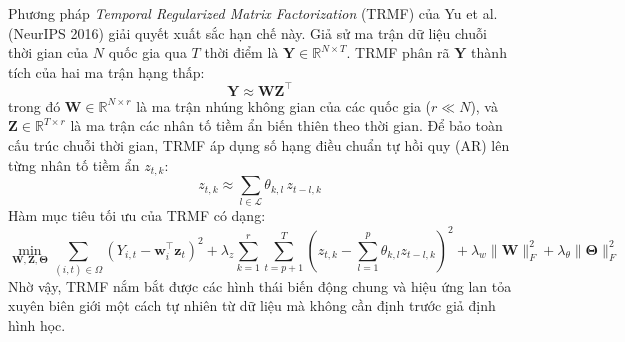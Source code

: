Phương pháp \textit{Temporal Regularized Matrix Factorization} (TRMF) của Yu et al. (NeurIPS 2016) \cite{yu2016trmf} giải quyết xuất sắc hạn chế này. Giả sử ma trận dữ liệu chuỗi thời gian của $N$ quốc gia qua $T$ thời điểm là $\mathbf{Y} \in \mathbb{R}^{N \times T}$. TRMF phân rã $\mathbf{Y}$ thành tích của hai ma trận hạng thấp:
\begin{equation}
    \mathbf{Y} \approx \mathbf{W} \mathbf{Z}^\top
\end{equation}
trong đó $\mathbf{W} \in \mathbb{R}^{N \times r}$ là ma trận nhúng không gian của các quốc gia ($r \ll N$), và $\mathbf{Z} \in \mathbb{R}^{T \times r}$ là ma trận các nhân tố tiềm ẩn biến thiên theo thời gian. Để bảo toàn cấu trúc chuỗi thời gian, TRMF áp dụng số hạng điều chuẩn tự hồi quy (AR) lên từng nhân tố tiềm ẩn $z_{t, k}$:
\begin{equation}
    z_{t, k} \approx \sum_{l \in \mathcal{L}} \theta_{k, l} \, z_{t-l, k}
\end{equation}
Hàm mục tiêu tối ưu của TRMF có dạng:
\begin{equation}
    \min_{\mathbf{W}, \mathbf{Z}, \bm{\Theta}} \sum_{(i, t) \in \Omega} (Y_{i, t} - \mathbf{w}_i^\top \mathbf{z}_t)^2 + \lambda_z \sum_{k=1}^r \sum_{t=p+1}^T \left( z_{t, k} - \sum_{l=1}^p \theta_{k, l} z_{t-l, k} \right)^2 + \lambda_w \|\mathbf{W}\|_F^2 + \lambda_\theta \|\bm{\Theta}\|_F^2
\end{equation}
Nhờ vậy, TRMF nắm bắt được các hình thái biến động chung và hiệu ứng lan tỏa xuyên biên giới một cách tự nhiên từ dữ liệu mà không cần định trước giả định hình học.

